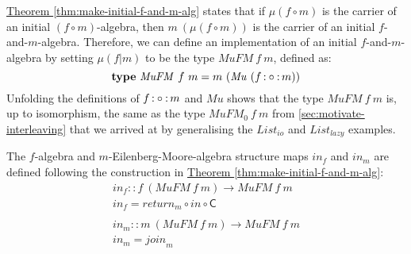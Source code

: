 \documentclass{jfp1}
\newcommand{\thmref}[1]{\hyperref[#1]{Theorem \ref*{#1}}}
\newcommand{\kw}[1]{\textbf{#1}}
\begin{document}
\thmref{thm:make-initial-f-and-m-alg} states that if $\mu(f \circ m)$
is the carrier of an initial $(f \circ m)$-algebra, then $m~(\mu(f
\circ m))$ is the carrier of an initial
$f$-and-$m$-algebra. Therefore, we can define an implementation of an
initial $f$-and-$m$-algebra by setting $\mu (f|m)$ to be the type
$\mathit{MuFM}~f~m$, defined as:
\begin{displaymath}
  \kw{type}~\mathit{MuFM}~f~m = m~(\mathit{Mu}~(f \fcompose m))
\end{displaymath}
Unfolding the definitions of $f \mathop{\mathord:\circ\mathord:} m$ and $\mathit{Mu}$ shows that
the type $\mathit{MuFM}~f~m$ is, up to isomorphism, the same as the
type $\mathit{MuFM_0}~f~m$ from \autoref{sec:motivate-interleaving}
that we arrived at by generalising the $\mathit{List_{io}}$ and
$\mathit{List_{lazy}}$ examples.

The $f$-algebra and $m$-Eilenberg-Moore-algebra structure maps
$\mathit{in}_f$ and $\mathit{in}_m$ are defined
following the construction in \thmref{thm:make-initial-f-and-m-alg}:
\begin{displaymath}
  \begin{array}{l}
    \mathit{in}_f :: f~(\mathit{MuFM}~f~m) \to \mathit{MuFM}~f~m \\
    \mathit{in}_f = \mathit{return}_m \circ \mathit{in} \circ \mathsf{C} \\
    \\
    \mathit{in}_m :: m~(\mathit{MuFM}~f~m) \to \mathit{MuFM}~f~m \\
    \mathit{in}_m = \mathit{join}_m
  \end{array}
\end{displaymath}
\end{document}
